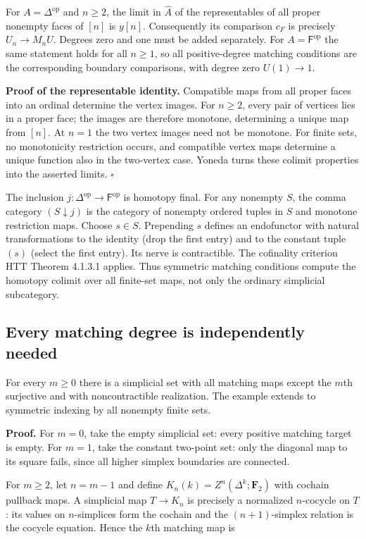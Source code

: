 \documentclass[11pt,a4paper]{article}
\theoremstyle{definition}
\begin{document}
For \(A=\Delta^{\mathrm{op}}\) and \(n\ge2\), the limit in
\(\widehat A\) of the representables of all proper nonempty faces of
\([n]\) is \(y[n]\). Consequently its comparison \(c_F\) is precisely
\(U_n\to M_nU\). Degrees zero and one must be added separately. For
\(A=\mathsf F^{\mathrm{op}}\) the same statement holds for all
\(n\ge1\), so all positive-degree matching conditions are the
corresponding boundary comparisons, with degree zero \(U(1)\to1\).

\textbf{Proof of the representable identity.} Compatible maps from all
proper faces into an ordinal determine the vertex images. For \(n\ge2\),
every pair of vertices lies in a proper face; the images are therefore
monotone, determining a unique map from \([n]\). At \(n=1\) the two
vertex images need not be monotone. For finite sets, no monotonicity
restriction occurs, and compatible vertex maps determine a unique
function also in the two-vertex case. Yoneda turns these colimit
properties into the asserted limits. \(\square\)

The inclusion \(j:\Delta^{\mathrm{op}}\to\mathsf F^{\mathrm{op}}\) is
homotopy final. For any nonempty \(S\), the comma category
\((S\downarrow j)\) is the category of nonempty ordered tuples in \(S\)
and monotone restriction maps. Choose \(s\in S\). Prepending \(s\)
defines an endofunctor with natural transformations to the identity
(drop the first entry) and to the constant tuple \((s)\) (select the
first entry). Its nerve is contractible. The cofinality criterion HTT
Theorem 4.1.3.1 applies. Thus symmetric matching conditions compute the
homotopy colimit over all finite-set maps, not only the ordinary
simplicial subcategory.

\subsection{Every matching degree is independently
needed}\label{b5.8.-every-matching-degree-is-independently-needed}

For every \(m\ge0\) there is a simplicial set
with all matching maps except the \(m\)th surjective and with
noncontractible realization. The example extends to symmetric indexing
by all nonempty finite sets.

\textbf{Proof.} For \(m=0\), take the empty simplicial set: every
positive matching target is empty. For \(m=1\), take the constant
two-point set: only the diagonal map to its square fails, since all
higher simplex boundaries are connected.

For \(m\ge2\), let \(n=m-1\) and define
\(K_n(k)=Z^n(\Delta^k;\mathbf F_2)\) with cochain pullback maps. A
simplicial map \(T\to K_n\) is precisely a normalized \(n\)-cocycle on
\(T\): its values on \(n\)-simplices form the cochain and the
\((n+1)\)-simplex relation is the cocycle equation. Hence the \(k\)th
matching map is
\end{document}
